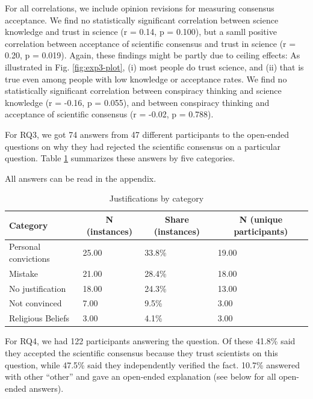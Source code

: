 \documentclass[
  doc,floatsintext]{apa6}
\begin{document}
For all correlations, we include opinion revisions for measuring consensus acceptance. We find no statistically significant correlation between science knowledge and trust in science (r = 0.14, p = 0.100), but a samll positive correlation between acceptance of scientific consensus and trust in science (r = 0.20, p = 0.019). Again, these findings might be partly due to ceiling effects: As illustrated in Fig. \ref{fig:exp3-plot}, (i) most people do trust science, and (ii) that is true even among people with low knowledge or acceptance rates. We find no statistically significant correlation between conspiracy thinking and science knowledge (r = -0.16, p = 0.055), and between conspiracy thinking and acceptance of scientific consensus (r = -0.02, p = 0.788).

For RQ3, we got 74 answers from 47 different participants to the open-ended questions on why they had rejected the scientific consensus on a particular question. Table \ref{tab:exp3-justifications} summarizes these answers by five categories.

All answers can be read in the appendix.

\begin{table}[tbp]

\begin{center}
\begin{threeparttable}

\caption{\label{tab:exp3-justifications}Justifications by category}

\begin{tabular}{llll}
\toprule
Category & \multicolumn{1}{c}{N (instances)} & \multicolumn{1}{c}{Share (instances)} & \multicolumn{1}{c}{N (unique participants)}\\
\midrule
Personal convictions & 25.00 & 33.8\% & 19.00\\
Mistake & 21.00 & 28.4\% & 18.00\\
No justification & 18.00 & 24.3\% & 13.00\\
Not convinced & 7.00 & 9.5\% & 3.00\\
Religious Beliefs & 3.00 & 4.1\% & 3.00\\
\bottomrule
\end{tabular}

\end{threeparttable}
\end{center}

\end{table}

For RQ4, we had 122 participants answering the question. Of these 41.8\% said they accepted the scientific consensus because they trust scientists on this question, while 47.5\% said they independently verified the fact. 10.7\% answered with other ``other'' and gave an open-ended explanation (see below for all open-ended answers).
\end{document}
